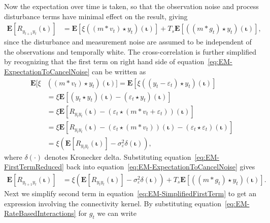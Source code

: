 \documentclass[]{article}
\begin{document}
Now the expectation over time is taken, so that the observation noise and process disturbance terms have minimal effect on the result, giving 
\begin{align}\label{eq:EM-ExpectationToCancelNoise}
	\mathbf{E}[R_{y_{t+1}y_t}(\boldsymbol{\iota})] &= \mathbf{E}[\xi\left(\left(m \ast v_t\right) \star y_t \right)(\boldsymbol{\iota})] + T_s \mathbf{E}[\left(\left(m\ast g_t\right)\star y_t \right)(\boldsymbol{\iota})],
\end{align}
since the disturbance and measurement noise are assumed to be independent of the observations and temporally white. 
The cross-correlation is further simplified by recognizing that the first term on right hand side of equation~\eqref{eq:EM-ExpectationToCancelNoise} can be written as 
\begin{align}
	\mathbf{E}[\xi&\left(\left(m \ast v_t \right) \star y_t \right)(\boldsymbol{\iota})] = \mathbf{E}\left[\xi\left(\left(y_t-\varepsilon_t\right) \star y_t \right)(\boldsymbol{\iota})\right] \nonumber \\
	&= \xi \mathbf{E}\left[ (y_t \star y_t)(\boldsymbol{\iota}) - \left(\varepsilon_t\star y_t \right)(\boldsymbol{\iota})\right] \nonumber \\
	&= \xi\mathbf{E}[ R_{y_ty_t}(\boldsymbol{\iota})  - \left(\varepsilon_t \star (m\ast v_t + \varepsilon_t)\right) (\boldsymbol{\iota})] \nonumber \\
	&=\xi\mathbf{E}[ R_{y_ty_t}(\boldsymbol{\iota}) -\left(\varepsilon_t\star (m\ast v_t)\right)(\boldsymbol{\iota}) - (\varepsilon_t\star\varepsilon_t)(\boldsymbol{\iota})] \nonumber \\
	&= \xi\left(\mathbf{E}[ R_{y_ty_t}(\boldsymbol{\iota})] - \sigma_{\varepsilon}^2 \delta(\boldsymbol{\iota})\right), \label{eq:EM-FirstTermReduced}
\end{align}
where $\delta\left(\cdot\right)$ denotes Kronecker delta. Substituting equation~\eqref{eq:EM-FirstTermReduced} back into equation~\eqref{eq:EM-ExpectationToCancelNoise} gives
\begin{align}\label{eq:EM-SimplifiedFirstTerm}
	\mathbf{E}[R_{y_{t+1}y_t}(\boldsymbol{\iota})] &= \xi\left(\mathbf{E}[ R_{y_ty_t}(\boldsymbol{\iota})] - \sigma_{\varepsilon}^2 \delta(\boldsymbol{\iota})\right)+ T_s\mathbf{E}[ \left(\left(m\ast g_t\right)\star y_t \right)(\boldsymbol{\iota})].
\end{align}
Next we simplify second term in equation~\eqref{eq:EM-SimplifiedFirstTerm} to get an expression involving the connectivity kernel. By substituting equation~\eqref{eq:EM-RateBasedInteractions} for $g_t$ we can write
\end{document}
